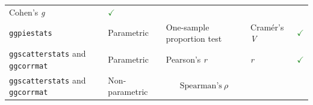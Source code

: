 \documentclass[]{article}
\begin{document}
\begin{longtable}[]{@{}lllll@{}}
\begin{minipage}[t]{0.12\columnwidth}
Cohen's \emph{g}\strut
\end{minipage} & \begin{minipage}[t]{0.07\columnwidth}\raggedright
\textcolor{ForestGreen}{$\checkmark$}\strut
\end{minipage}\tabularnewline
\begin{minipage}[t]{0.20\columnwidth}\raggedright
\texttt{ggpiestats}\strut
\end{minipage} & \begin{minipage}[t]{0.16\columnwidth}\raggedright
Parametric\strut
\end{minipage} & \begin{minipage}[t]{0.31\columnwidth}\raggedright
One-sample proportion test\strut
\end{minipage} & \begin{minipage}[t]{0.12\columnwidth}\raggedright
Cramér's \emph{V}\strut
\end{minipage} & \begin{minipage}[t]{0.07\columnwidth}\raggedright
\textcolor{ForestGreen}{$\checkmark$}\strut
\end{minipage}\tabularnewline
\begin{minipage}[t]{0.20\columnwidth}\raggedright
\texttt{ggscatterstats} and \texttt{ggcorrmat}\strut
\end{minipage} & \begin{minipage}[t]{0.16\columnwidth}\raggedright
Parametric\strut
\end{minipage} & \begin{minipage}[t]{0.31\columnwidth}\raggedright
Pearson's \emph{r}\strut
\end{minipage} & \begin{minipage}[t]{0.12\columnwidth}\raggedright
\emph{r}\strut
\end{minipage} & \begin{minipage}[t]{0.07\columnwidth}\raggedright
\textcolor{ForestGreen}{$\checkmark$}\strut
\end{minipage}\tabularnewline
\begin{minipage}[t]{0.20\columnwidth}\raggedright
\texttt{ggscatterstats} and \texttt{ggcorrmat}\strut
\end{minipage} & \begin{minipage}[t]{0.16\columnwidth}\raggedright
Non-parametric\strut
\end{minipage} & \begin{minipage}[t]{0.31\columnwidth}\raggedright
\[\text{Spearman's}~ \rho\]\strut
\end{minipage} & \begin{minipage}[t]{0.12\columnwidth}\raggedright

\end{minipage}
\end{longtable}
\end{document}
